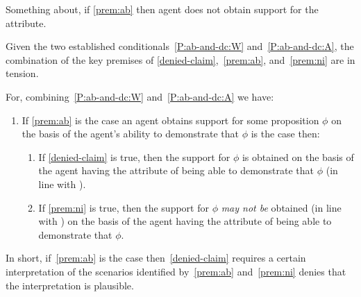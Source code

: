 \documentclass[10pt]{article}
\begin{document}
\begin{note}
  Something about, if \ref{prem:ab} then agent does not obtain support for the attribute.
\end{note}

\begin{note}[Summary]
  Given the two established conditionals~\ref{P:ab-and-dc:W} and~\ref{P:ab-and-dc:A}, the combination of the key premises of \ref{denied-claim},~\ref{prem:ab}, and~\ref{prem:ni} are in tension.

  For, combining~\ref{P:ab-and-dc:W} and~\ref{P:ab-and-dc:A} we have:
  \begin{enumerate}[label=(CC), ref=(CC)]
  \item If \ref{prem:ab} is the case an agent obtains support for some proposition \(\phi\) on the basis of the agent's ability to demonstrate that \(\phi\) is the case then:
    \begin{enumerate}[label=(C\arabic*\(\sim\)), ]
    \item If \ref{denied-claim} is true, then the support for \(\phi\) is obtained on the basis of the agent having the attribute of being able to demonstrate that \(\phi\) (in line with \AR{}).
    \item If \ref{prem:ni} is true, then the support for \(\phi\) \emph{may not be} obtained (in line with \AR{}) on the basis of the agent having the attribute of being able to demonstrate that \(\phi\).
    \end{enumerate}
  \end{enumerate}
  In short, if~\ref{prem:ab} is the case then~\ref{denied-claim} requires a certain interpretation of the scenarios identified by~\ref{prem:ab} and~\ref{prem:ni} denies that the interpretation is plausible.
\end{note}
\end{document}
